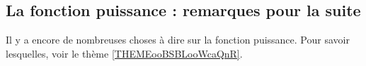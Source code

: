 \subsection{La fonction puissance : remarques pour la suite}

Il y a encore de nombreuses choses à dire sur la fonction puissance. Pour savoir lesquelles, voir le thème \ref{THEMEooBSBLooWcaQnR}.

